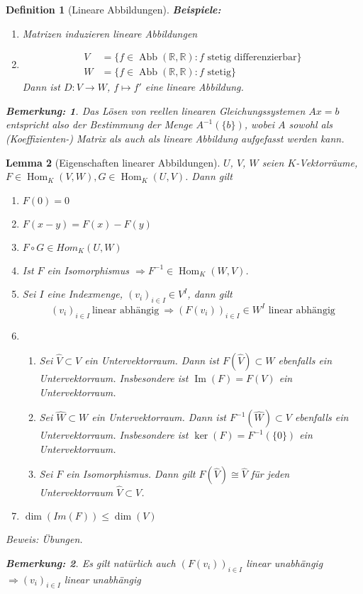 \documentclass{report}
\newcommand{\R}{\mathbb{R}}
\DeclareMathOperator{\abb}{Abb}
\DeclareMathOperator{\Hom}{Hom}
\DeclareMathOperator{\Ima}{Im}
\theoremstyle{customrem}
\newtheorem*{bem}{Bemerkung:}
\theoremstyle{customdef}
\newtheorem{definition}{Definition}[chapter]
\newtheorem{lemma}[definition]{Lemma}
\begin{document}
\begin{definition}[Lineare Abbildungen]
		\noindent\textbf{Beispiele: }
		\begin{enumerate}
			\item Matrizen induzieren lineare Abbildungen
			\item 
			\begin{align*}
				V &= \{f \in \abb(\R, \R) : f \text{ stetig differenzierbar}\}\\
				W &= \{f \in \abb(\R, \R) : f \text{ stetig}\}
			\end{align*}
			Dann ist $D : V \to W$, $f \mapsto f'$ eine lineare Abbildung.
		\end{enumerate}
		
		\begin{bem}
			Das Lösen von reellen linearen Gleichungssystemen $Ax = b$ entspricht also der Bestimmung der Menge $A^{-1}(\{b\})$, wobei $A$ sowohl als (Koeffizienten-) Matrix als auch als lineare Abbildung aufgefasst werden kann.
		\end{bem}
	\end{definition}

	\begin{lemma}[Eigenschaften linearer Abbildungen]
		\label{lem32}
		$U$, $V$, $W$ seien $K$-Vektorräume, $F \in \Hom_K(V,W), G \in \Hom_K(U, V)$. Dann gilt
		\begin{enumerate}
			\item $F(0) = 0$
			\item $F(x - y) = F(x) - F(y)$
			\item $F \circ G \in Hom_K(U, W)$
			\item Ist $F$ ein Isomorphismus $\Rightarrow F^{-1} \in \Hom_K(W, V)$.
			\item Sei $I$ eine  Indexmenge, $(v_i)_{i \in I} \in V^I$, dann gilt
				$$(v_i)_{i \in I}\ \text{linear abhängig} \ \Rightarrow (F(v_i))_{i \in I} \in W^I \text{ linear abhängig}$$
			\item 
				\begin{enumerate}
					\item Sei $\hat{V} \subset V$ ein Untervektorraum. Dann ist $F(\hat{V}) \subset W$  ebenfalls ein Untervektorraum. Insbesondere ist $\Ima(F) = F(V)$ ein Untervektorraum.
					\item Sei $\hat{W} \subset W$ ein Untervektorraum. Dann ist $F^{-1}(\hat{W}) \subset V$  ebenfalls ein Untervektorraum. Insbesondere ist $\ker(F) = F^{-1}(\{0\})$ ein Untervektorraum.
					\item Sei $F$ ein Isomorphismus. Dann gilt $F(\hat{V}) \cong \hat{V}$ für jeden Untervektorraum $\hat{V} \subset V$. 
				\end{enumerate}
			\item $\dim(Im(F)) \leq \dim(V)$
		\end{enumerate}
		Beweis: Übungen.\\
		\begin{bem}
			Es gilt natürlich auch $(F (v_i))_{i \in I}$ linear unabhängig $\Rightarrow (v_i)_{i \in I}$ linear unabhängig	
		\end{bem}
	\end{lemma}
	
\end{document}
